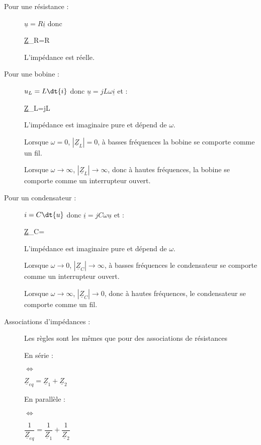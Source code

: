 \documentclass{cours}
\begin{document}
\begin{description}
\item[Pour une résistance :] $\underline{u}=R \underline{i}$ donc 
\begin{eqencadre}
\underline{Z}_R=R
\end{eqencadre} 
L'impédance est réelle.

\item[Pour une bobine :] $u_L=L\dt{i}$ donc $\underline{u}=jL\omega \underline{i}$ et :
\begin{eqencadre}
\underline{Z}_L=jL\omega
\end{eqencadre} 
L'impédance est imaginaire pure et dépend de $\omega$.

Lorsque $\omega=0$, $|\underline{Z}_L|=0$, à basses fréquences la bobine se comporte comme un fil.

Lorsque $\omega\rightarrow\infty$, $|\underline{Z}_L|\rightarrow\infty$, donc à hautes fréquences, la bobine se comporte comme un interrupteur ouvert.

\item[Pour un condensateur :] $i=C\dt{u}$ donc $\underline{i} = jC\omega \underline{u}$ et :
\begin{eqencadre}
\underline{Z}_C=
\end{eqencadre}
L'impédance est imaginaire pure et dépend de $\omega$.

Lorsque $\omega\rightarrow 0$, $|\underline{Z}_C|\rightarrow\infty$, à basses fréquences le condensateur se comporte comme un interrupteur ouvert.

Lorsque $\omega\rightarrow\infty$, $|\underline{Z}_C|\rightarrow 0$, donc à hautes fréquences, le condensateur se comporte comme un fil.


\item[Associations d'impédances :]Les règles sont les mêmes que pour des associations de résistances

En série : 
$\Leftrightarrow$
\hspace{1cm} $\underline{Z}_{eq}=\underline{Z}_1+\underline{Z}_2$

En parallèle : 
$\Leftrightarrow$
\hspace{1cm} $\dfrac{1}{\underline{Z}_{eq}}=\dfrac{1}{\underline{Z}_1}+\dfrac{1}{\underline{Z}_2}$
\end{description}
\end{document}
